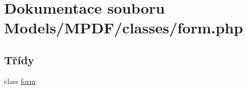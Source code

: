 \hypertarget{form_8php}{\section{Dokumentace souboru Models/\-M\-P\-D\-F/classes/form.php}
\label{form_8php}
}
\subsection*{Třídy}
\begin{DoxyCompactItemize}
\item 
class \hyperlink{classform}{form}
\end{DoxyCompactItemize}
